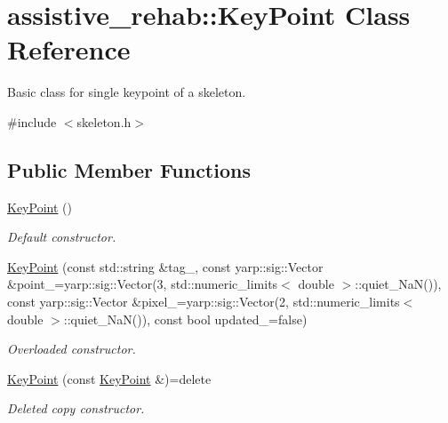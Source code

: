 \section{assistive\+\_\+rehab\+::Key\+Point Class Reference}
\label{classassistive__rehab_1_1KeyPoint}


Basic class for single keypoint of a skeleton.  




{\ttfamily \#include $<$skeleton.\+h$>$}

\subsection*{Public Member Functions}
\begin{DoxyCompactItemize}
\item 
\mbox{\label{classassistive__rehab_1_1KeyPoint_a8b4ce35fc2c7101f1135b9c7530f053d}} 
\mbox{\hyperlink{classassistive__rehab_1_1KeyPoint_a8b4ce35fc2c7101f1135b9c7530f053d}{Key\+Point}} ()
\begin{DoxyCompactList}\small\item\em Default constructor. \end{DoxyCompactList}\item 
\mbox{\hyperlink{classassistive__rehab_1_1KeyPoint_ad146e6b6fe96ae4eeaa9d4fa8eaebb40}{Key\+Point}} (const std\+::string \&tag\+\_\+, const yarp\+::sig\+::\+Vector \&point\+\_\+=yarp\+::sig\+::\+Vector(3, std\+::numeric\+\_\+limits$<$ double $>$\+::quiet\+\_\+\+NaN()), const yarp\+::sig\+::\+Vector \&pixel\+\_\+=yarp\+::sig\+::\+Vector(2, std\+::numeric\+\_\+limits$<$ double $>$\+::quiet\+\_\+\+NaN()), const bool updated\+\_\+=false)
\begin{DoxyCompactList}\small\item\em Overloaded constructor. \end{DoxyCompactList}\item 
\mbox{\label{classassistive__rehab_1_1KeyPoint_add33d1e673dcbae72449b6843482c6e9}} 
\mbox{\hyperlink{classassistive__rehab_1_1KeyPoint_add33d1e673dcbae72449b6843482c6e9}{Key\+Point}} (const \mbox{\hyperlink{classassistive__rehab_1_1KeyPoint}{Key\+Point}} \&)=delete
\begin{DoxyCompactList}\small\item\em Deleted copy constructor. \end{DoxyCompactList}\item 
\mbox{\label{classassistive__rehab_1_1KeyPoint_aecdf117e438bedb51734c7d2730e6d61}} 

\end{DoxyCompactItemize}
